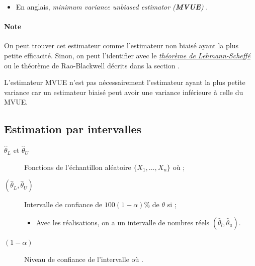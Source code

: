 \documentclass[10pt, french]{article}
\begin{document}
\begin{multicols*}{2}
\begin{definitionNOHFILL}
\begin{itemize}
	\item	En anglais, \og \textit{minimum variance unbiased estimator (\textbf{MVUE})} \fg{}.
\end{itemize}
\end{definitionNOHFILL}

\paragraph{Note}	On peut trouver cet estimateur comme l'estimateur non biaisé ayant la plus petite efficacité. Sinon, on peut l'identifier avec le \underline{\textit{\hyperlink{lehSchTh}{théorème de Lehmann-Scheffé}}} ou le théorème de Rao-Blackwell décrits dans la section \underline{\textit{}}.

\begin{rappel_enhanced}[Limitations]
L'estimateur MVUE n'est pas nécessairement l'estimateur ayant la plus petite variance car un estimateur biaisé peut avoir une variance inférieure à celle du MVUE.
\end{rappel_enhanced}





\columnbreak
\subsection{Estimation par intervalles}\label{sec:int-estimation}
\begin{distributions}[Notation]
\begin{description}
	\item[$\hat{\theta}_{L}$ et $\hat{\theta}_{U}$]	Fonctions de l'échantillon aléatoire $\{X_{1}, \dots, X_{n}\}$ où ;
	\item[$(\hat{\theta}_{L}, \hat{\theta}_{U})$]	Intervalle de confiance de $100(1 - \alpha)\%$ de $\theta$ si ;
		\begin{itemize}
		\item	Avec les réalisations, on a un intervalle de nombres réels $(\hat{\theta}_{l}, \hat{\theta}_{u})$.
		\end{itemize}
	\item[$(1 - \alpha)$]	Niveau de confiance de l'intervalle où .
\end{description}
\end{distributions}


\end{multicols*}
\end{document}
